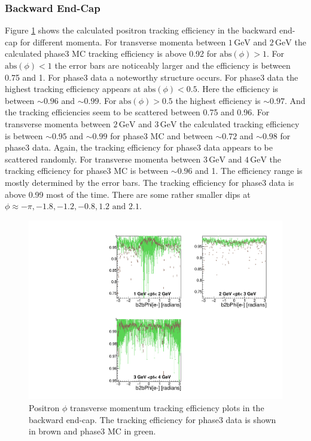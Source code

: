 \documentclass[a4paper,11pt,twosided,final,german,openbib,pdftex,listof=totoc,bibliography=totoc]{scrbook}
\begin{document}
\clearpage

\subsubsection{Backward End-Cap}



Figure \ref{plt:xPtMPhiepEC3} shows the calculated positron tracking efficiency in the backward end-cap for different momenta.
For transverse momenta between $1\,\textrm{GeV}$ and $2\,\textrm{GeV}$ the calculated phase3 MC tracking efficiency is above 0.92 for $\textrm{abs}(\phi) >1$. For $\textrm{abs}(\phi)<1$ the error bars are noticeably larger and the efficiency is between 0.75 and 1. For phase3 data a noteworthy structure occurs. For phase3 data the highest tracking efficiency appears at $\textrm{abs}(\phi) <0.5$. Here the efficiency is between $\sim 0.96$ and $\sim 0.99$. For $\textrm{abs}(\phi) > 0.5$ the highest efficiency is $\sim 0.97$. And the tracking efficiencies seem to be scattered between 0.75 and 0.96.
For transverse momenta between $2\,\textrm{GeV}$ and $3\,\textrm{GeV}$ the calculated tracking efficiency is between $\sim 0.95$ and $\sim 0.99$ for phase3 MC and between $\sim 0.72$ and $\sim 0.98$ for phase3 data. Again, the tracking efficiency for phase3 data appears to be scattered randomly.
For transverse momenta between $3\,\textrm{GeV}$ and $4\,\textrm{GeV}$ the tracking efficiency for phase3 MC is between $\sim 0.96$ and 1. The efficiency range is mostly determined by the error bars. The tracking efficiency for phase3 data is above 0.99 most of the time. There are some rather smaller dips at $\phi \approx -\pi, -1.8, -1.2, -0.8, 1.2 \textrm{ and } 2.1$.



\begin{figure}[!htbp]
	\centering
	\includegraphics[width=\textwidth]{Plots/master3/xPtMPhiepECP3}
	\caption[Transverse Momentum $\phi$ Positron Backward End-Cap Efficiency Phase3]{Positron $\phi$ transverse momentum tracking efficiency plots in the backward end-cap. The tracking efficiency for phase3 data is shown in brown and phase3 MC in green.}
	
	\label{plt:xPtMPhiepEC3}
\end{figure}
\end{document}
